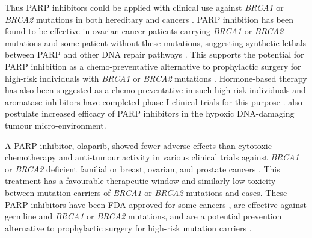 Thus \gls{PARP} inhibitors could be applied with clinical use against \textit{BRCA1} or \textit{BRCA2} \glspl{mutation} in both \gls{hereditary} and  cancers \citep{Ashworth2008, Kaelin2005}. \gls{PARP} inhibition has been found to be effective in ovarian cancer patients carrying \textit{BRCA1} or \textit{BRCA2} \glspl{mutation} and some patient without these \glspl{mutation}, suggesting \glspl{synthetic lethal} between \gls{PARP} and other \acrshort{DNA} repair \glspl{pathway} \citep{Strom2012}. This supports the potential for \gls{PARP} inhibition as a chemo-preventative alternative to prophylactic surgery for high-risk individuals with \textit{BRCA1} or \textit{BRCA2} \glspl{mutation} \citep{Strom2012}. Hormone-based therapy has also been suggested as a chemo-preventative in such high-risk individuals and aromatase inhibitors have completed phase I clinical trials for this purpose \citep{Bozovic-Spasojevic2012}. \citet{Strom2012} also postulate increased efficacy of \gls{PARP} inhibitors in the hypoxic \acrshort{DNA}-damaging tumour micro-environment.  

A \gls{PARP} inhibitor, olaparib, showed fewer adverse effects than cytotoxic \gls{chemotherapy} and anti-tumour activity in various clinical trials against \textit{BRCA1} or \textit{BRCA2} deficient \gls{familial} or  breast, ovarian, and prostate cancers \citep{Fong2009, Fong2010, Tutt2010, Audeh2010}. 
This treatment has a favourable therapeutic window and similarly low toxicity between \gls{mutation} carriers of \textit{BRCA1} or \textit{BRCA2} \glspl{mutation} and  cases. 
These \gls{PARP} inhibitors have been FDA approved for some cancers \cite{McLachlan2016}, are effective against \gls{germline} and  \textit{BRCA1} or \textit{BRCA2} \glspl{mutation}, and are a potential prevention alternative to prophylactic surgery for high-risk \gls{mutation} carriers \cite{Strom2012}. 

